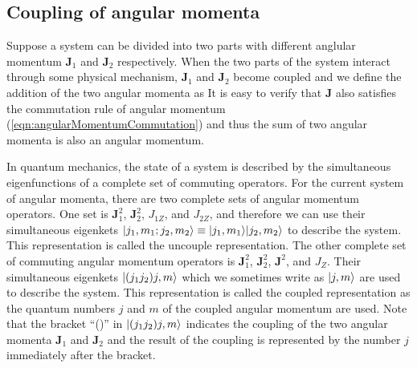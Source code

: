 \subsection{Coupling of angular momenta}

Suppose a system can be divided into two parts with different anglular momentum $\mathbf{J}_1$ and $\mathbf{J}_2$ 
respectively. When the two parts of the system interact through some physical mechanism, $\mathbf{J}_1$ and 
$\mathbf{J}_2$ become coupled and we define the addition of the two angular momenta as
It is easy to verify that $\mathbf{J}$ also satisfies the commutation rule of angular momentum
 (\autoref{eqn:angularMomentumCommutation}) and thus the sum of two angular momenta  is also an angular momentum.

In quantum mechanics, the state of a system is described by the simultaneous eigenfunctions of a complete set of 
commuting operators. For the current system of angular momenta, there are two complete sets of angular momentum
operators.  One set is $\mathbf{J}_1^2$, $\mathbf{J}_2^2$, $J_{1Z}$, and $J_{2Z}$, and therefore we can use their
simultaneous eigenkets $| j_1, m_1; j_2, m_2 \rangle\equiv | j_1, m_1 \rangle| j_2, m_2 \rangle$ to describe the system.
This representation is called the uncouple representation. The other complete set of commuting angular 
 momentum operators is $\mathbf{J}_1^2$, $\mathbf{J}_2^2$, $\mathbf{J}^2$, and $J_Z$. Their simultaneous 
 eigenkets $| (j_1 j_2)j, m \rangle$ which we sometimes write as $| j, m \rangle$ are used to describe the system. This
  representation is called the coupled representation as the quantum numbers $j$ and $m$ of the coupled angular 
  momentum are used. Note that the bracket ``()'' in $| (j_1 j_2)j, m \rangle$ indicates the coupling of the two 
  angular momenta $\mathbf{J}_1$ and $\mathbf{J}_2$ and the result of the coupling is represented by the number $j$ immediately after the bracket.

